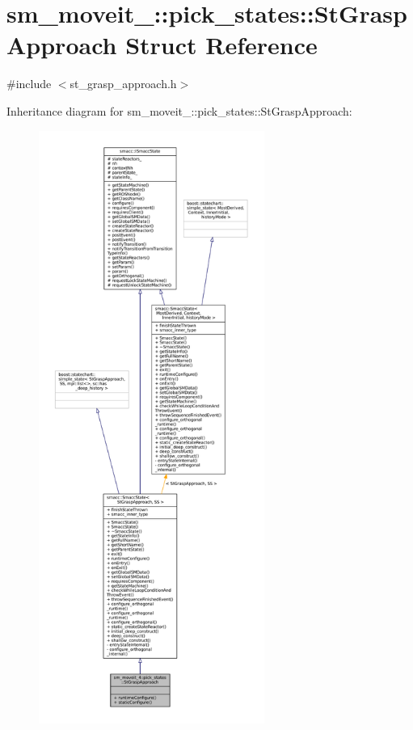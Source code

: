 \hypertarget{structsm__moveit__4_1_1pick__states_1_1StGraspApproach}{}\section{sm\+\_\+moveit\+\_\+:\+:pick\+\_\+states\+:\+:St\+Grasp\+Approach Struct Reference}
\label{structsm__moveit__4_1_1pick__states_1_1StGraspApproach}


{\ttfamily \#include $<$st\+\_\+grasp\+\_\+approach.\+h$>$}



Inheritance diagram for sm\+\_\+moveit\+\_\+:\+:pick\+\_\+states\+:\+:St\+Grasp\+Approach\+:
\nopagebreak
\begin{figure}[H]
\begin{center}
\leavevmode
\includegraphics[height=550pt]{structsm__moveit__4_1_1pick__states_1_1StGraspApproach__inherit__graph}
\end{center}
\end{figure}


